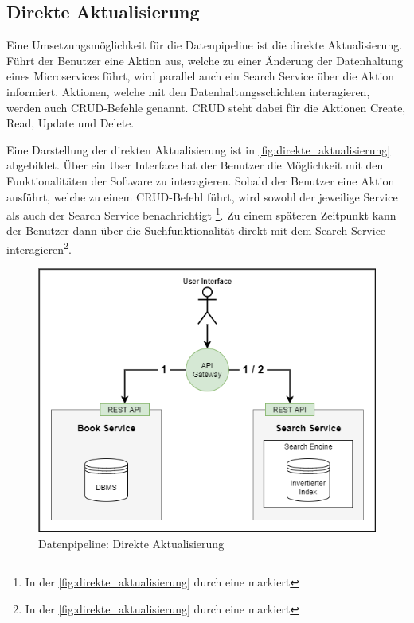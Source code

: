 \subsection{Direkte Aktualisierung\label{subsec4.3.2:Unterunterpunkt-2}}

Eine Umsetzungsmöglichkeit für die Datenpipeline ist die direkte Aktualisierung. Führt der Benutzer eine Aktion aus, welche zu einer Änderung der Datenhaltung eines Microservices führt, wird parallel auch ein Search Service über die Aktion informiert. Aktionen, welche mit den Datenhaltungsschichten interagieren, werden auch CRUD-Befehle genannt. CRUD steht dabei für die Aktionen \glqq Create\grqq{}, \glqq Read\grqq{}, \glqq Update\grqq{} und \glqq Delete\grqq{}.

Eine Darstellung der direkten Aktualisierung ist in \autoref{fig:direkte_aktualisierung} abgebildet. Über ein User Interface hat der Benutzer die Möglichkeit mit den Funktionalitäten der Software zu interagieren. Sobald der Benutzer eine Aktion ausführt, welche zu einem CRUD-Befehl führt, wird sowohl der jeweilige Service als auch der Search Service benachrichtigt \footnote{In der \autoref{fig:direkte_aktualisierung} durch eine \grqq{} markiert}. Zu einem späteren Zeitpunkt kann der Benutzer dann über die Suchfunktionalität direkt mit dem Search Service interagieren\footnote{In der \autoref{fig:direkte_aktualisierung} durch eine \grqq{} markiert}.

\begin{figure}[H]
    \centering
    \includegraphics[width=0.6\linewidth]{images/direkte_aktualisierung.png}
    \caption{Datenpipeline: Direkte Aktualisierung}
    \label{fig:direkte_aktualisierung}
\end{figure}

